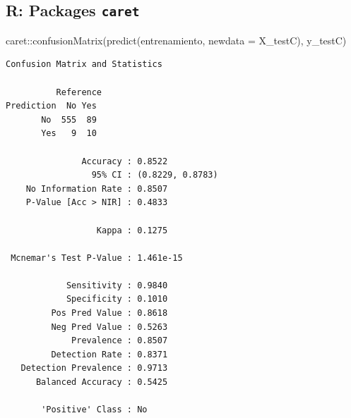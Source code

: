 \documentclass[
  letterpaper,
  DIV=11,
  numbers=noendperiod]{scrartcl}
\newenvironment{Shaded}{\begin{snugshade}}{\end{snugshade}}
\newcommand{\AttributeTok}[1]{\textcolor[rgb]{0.40,0.45,0.13}{#1}}
\newcommand{\FunctionTok}[1]{\textcolor[rgb]{0.28,0.35,0.67}{#1}}
\newcommand{\NormalTok}[1]{\textcolor[rgb]{0.00,0.23,0.31}{#1}}
\newcommand{\SpecialCharTok}[1]{\textcolor[rgb]{0.37,0.37,0.37}{#1}}
\begin{document}
\subsection{\texorpdfstring{R: Packages
\texttt{caret}}{R: Packages caret}}

\begin{Shaded}
\begin{Highlighting}[]
\NormalTok{caret}\SpecialCharTok{::}\FunctionTok{confusionMatrix}\NormalTok{(}\FunctionTok{predict}\NormalTok{(entrenamiento, }\AttributeTok{newdata =}\NormalTok{ X\_testC), y\_testC)}
\end{Highlighting}
\end{Shaded}

\begin{verbatim}
Confusion Matrix and Statistics

          Reference
Prediction  No Yes
       No  555  89
       Yes   9  10
                                          
               Accuracy : 0.8522          
                 95% CI : (0.8229, 0.8783)
    No Information Rate : 0.8507          
    P-Value [Acc > NIR] : 0.4833          
                                          
                  Kappa : 0.1275          
                                          
 Mcnemar's Test P-Value : 1.461e-15       
                                          
            Sensitivity : 0.9840          
            Specificity : 0.1010          
         Pos Pred Value : 0.8618          
         Neg Pred Value : 0.5263          
             Prevalence : 0.8507          
         Detection Rate : 0.8371          
   Detection Prevalence : 0.9713          
      Balanced Accuracy : 0.5425          
                                          
       'Positive' Class : No              
                                          
\end{verbatim}
\end{document}
